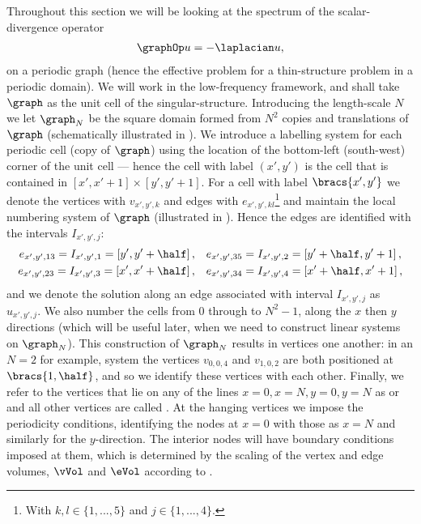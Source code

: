 Throughout this section we will be looking at the spectrum of the scalar-divergence operator 
\begin{align*}
	\graphOp u = -\laplacian u,
\end{align*}
on a periodic graph (hence the effective problem for a thin-structure problem in a periodic domain).
We will work in the low-frequency framework, and shall take $\graph$ as the unit cell of the singular-structure.
Introducing the length-scale $N$ we let $\graph_{N}$ be the square domain formed from $N^{2}$ copies and translations of $\graph$ (schematically illustrated in ).
We introduce a labelling system for each periodic cell (copy of $\graph$) using the location of the bottom-left (south-west) corner of the unit cell --- hence the cell with label $(x',y')$ is the cell that is contained in $[x',x'+1]\times[y',y'+1]$.
For a cell with label $\bracs{x',y'}$ we denote the vertices with $v_{x',y', k}$ and edges with $e_{x',y',kl}$\footnote{With $k,l\in\{1,...,5\}$ and $j\in\{1,...,4\}$.} and maintain the local numbering system of $\graph$ (illustrated in ).
Hence the edges are identified with the intervals $I_{x',y',j}$:
\begin{align*}
	e_{x',y',13} = I_{x',y',1} = \left[y', y'+\half \right], &\quad e_{x',y',35} = I_{x',y',2} = \left[ y'+\half, y'+1 \right], \\
	e_{x',y',23} = I_{x',y',3} = \left[x', x'+\half \right], &\quad e_{x',y',34} = I_{x',y',4} = \left[ x'+\half, x'+1 \right],
\end{align*}
and we denote the solution along an edge associated with interval $I_{x',y',j}$ as $u_{x',y',j}$.
We also number the cells from $0$ through to $N^{2}-1$, along the $x$ then $y$ directions (which will be useful later, when we need to construct linear systems on $\graph_{N}$).
This construction of $\graph_{N}$ results in vertices  one another: in an $N=2$ for example, system the vertices $v_{0,0,4}$ and $v_{1,0,2}$ are both positioned at $\bracs{1,\half}$, and so we identify these vertices with each other.
Finally, we refer to the vertices that lie on any of the lines $x=0, x=N, y=0, y=N$ as  or  and all other vertices are called .
At the hanging vertices we impose the periodicity conditions, identifying the nodes at $x=0$ with those as $x=N$ and similarly for the $y$-direction.
The interior nodes will have boundary conditions imposed at them, which is determined by the scaling of the vertex and edge volumes, $\vVol$ and $\eVol$ according to .
